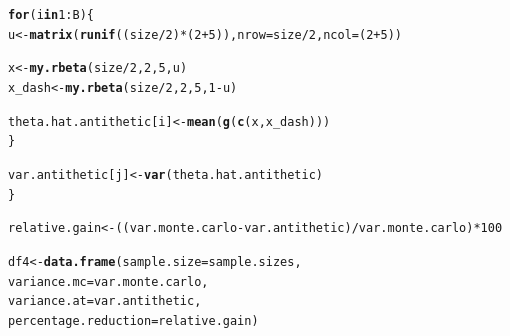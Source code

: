 \documentclass[11pt, a4paper]{article}\usepackage[]{graphicx}\usepackage[]{xcolor}
\makeatletter
\newcommand{\hlnum}[1]{\textcolor[rgb]{0.686,0.059,0.569}{#1}}%
\newcommand{\hlopt}[1]{\textcolor[rgb]{0,0,0}{#1}}%
\newcommand{\hldef}[1]{\textcolor[rgb]{0.345,0.345,0.345}{#1}}%
\newcommand{\hlkwa}[1]{\textcolor[rgb]{0.161,0.373,0.58}{\textbf{#1}}}%
\newcommand{\hlkwb}[1]{\textcolor[rgb]{0.69,0.353,0.396}{#1}}%
\newcommand{\hlkwc}[1]{\textcolor[rgb]{0.333,0.667,0.333}{#1}}%
\newcommand{\hlkwd}[1]{\textcolor[rgb]{0.737,0.353,0.396}{\textbf{#1}}}%
\newenvironment{kframe}{%
 \def\at@end@of@kframe{}%
 \ifinner\ifhmode%
  \def\at@end@of@kframe{\end{minipage}}%
  \begin{minipage}{\columnwidth}%
 \fi\fi%
 \def\FrameCommand##1{\hskip\@totalleftmargin \hskip-\fboxsep
 \colorbox{shadecolor}{##1}\hskip-\fboxsep
     \hskip-\linewidth \hskip-\@totalleftmargin \hskip\columnwidth}%
 \MakeFramed {\advance\hsize-\width
   \@totalleftmargin\z@ \linewidth\hsize
   \@setminipage}}%
 {\par\unskip\endMakeFramed%
 \at@end@of@kframe}
\newenvironment{knitrout}{}{} %
\makeatother
\begin{document}
\begin{enumerate}
\begin{knitrout}
\begin{kframe}
\begin{alltt}
  \hlkwa{for} \hldef{(i} \hlkwa{in} \hlnum{1}\hlopt{:}\hldef{B) \{}
    \hldef{u} \hlkwb{<-} \hlkwd{matrix}\hldef{(}\hlkwd{runif}\hldef{((size} \hlopt{/} \hlnum{2}\hldef{)} \hlopt{*} \hldef{(}\hlnum{2} \hlopt{+} \hlnum{5}\hldef{)),} \hlkwc{nrow} \hldef{= size} \hlopt{/} \hlnum{2}\hldef{,} \hlkwc{ncol} \hldef{= (}\hlnum{2} \hlopt{+} \hlnum{5}\hldef{))}

    \hldef{x} \hlkwb{<-} \hlkwd{my.rbeta}\hldef{(size} \hlopt{/} \hlnum{2}\hldef{,} \hlnum{2}\hldef{,} \hlnum{5}\hldef{, u)}
    \hldef{x_dash} \hlkwb{<-} \hlkwd{my.rbeta}\hldef{(size} \hlopt{/} \hlnum{2}\hldef{,} \hlnum{2}\hldef{,} \hlnum{5}\hldef{,} \hlnum{1}\hlopt{-}\hldef{u)}

    \hldef{theta.hat.antithetic[i]} \hlkwb{<-} \hlkwd{mean}\hldef{(}\hlkwd{g}\hldef{(}\hlkwd{c}\hldef{(x, x_dash)))}
  \hldef{\}}

  \hldef{var.antithetic[j]} \hlkwb{<-} \hlkwd{var}\hldef{(theta.hat.antithetic)}
\hldef{\}}
\end{alltt}
\end{kframe}
\end{knitrout}

\begin{knitrout}
\color{fgcolor}\begin{kframe}
\begin{alltt}
\hldef{relative.gain} \hlkwb{<-} \hldef{((var.monte.carlo} \hlopt{-} \hldef{var.antithetic)} \hlopt{/} \hldef{var.monte.carlo)} \hlopt{*} \hlnum{100}
\end{alltt}
\end{kframe}
\end{knitrout}

\begin{knitrout}
\color{fgcolor}\begin{kframe}
\begin{alltt}
\hldef{df4} \hlkwb{<-} \hlkwd{data.frame}\hldef{(}\hlkwc{sample.size} \hldef{= sample.sizes,}
                  \hlkwc{variance.mc} \hldef{= var.monte.carlo,}
                  \hlkwc{variance.at} \hldef{= var.antithetic,}
                  \hlkwc{percentage.reduction} \hldef{= relative.gain)}
\end{alltt}
\end{kframe}
\end{knitrout}

\newpage



\end{enumerate}
\end{document}
